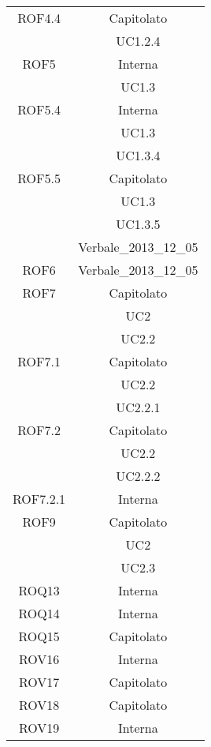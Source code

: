 \begin{longtable}{|c|c|}
\midrule
ROF4.4
& Capitolato\\
& UC1.2.4\\

\midrule
ROF5
& Interna\\
& UC1.3\\

\midrule
ROF5.4
& Interna\\
& UC1.3\\
& UC1.3.4\\

\midrule
ROF5.5
& Capitolato\\
& UC1.3\\
& UC1.3.5\\
& Verbale\_2013\_12\_05\\

\midrule
ROF6
& Verbale\_2013\_12\_05\\

\midrule
ROF7
& Capitolato\\
& UC2\\
& UC2.2\\

\midrule
ROF7.1
& Capitolato\\
& UC2.2\\
& UC2.2.1\\

\midrule
ROF7.2
& Capitolato\\
& UC2.2\\
& UC2.2.2\\

\midrule
ROF7.2.1
& Interna\\

\midrule
ROF9
& Capitolato\\
& UC2\\
& UC2.3\\

\midrule
ROQ13
& Interna\\

\midrule
ROQ14
& Interna\\

\midrule
ROQ15
& Capitolato\\

\midrule
ROV16
& Interna\\

\midrule
ROV17
& Capitolato\\

\midrule
ROV18
& Capitolato\\

\midrule
ROV19
& Interna\\


\end{longtable}
